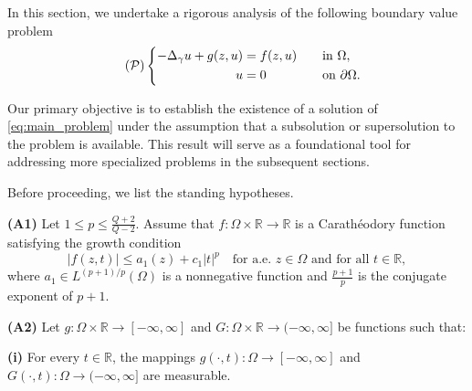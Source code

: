 \documentclass[11pt]{article}
\newcommand{\Gr}{\Delta_{\gamma}}
\begin{document}
In this section, we undertake a rigorous analysis of the following boundary value problem
\begin{equation}
\label{eq:main_problem}\tag{$\mathcal{P}$}
\begin{cases}
\begin{aligned}
- \Gr u + g(z,u) &= f(z,u) \quad &&\text{in } \Omega, \\
u &= 0 \quad &&\text{on } \partial\Omega. 
\end{aligned}
\end{cases}
\end{equation}

Our primary objective is to establish the existence of a solution of \eqref{eq:main_problem} under the assumption that a subsolution or supersolution to the problem is available. This result will serve as a foundational tool for addressing more specialized problems in the subsequent sections.

Before proceeding, we list the standing hypotheses. 

\medskip


\medskip

 \textbf{(A1)} Let $1 \le p \le \frac{Q+2}{Q-2}$. 
Assume that $f : \Omega \times \mathbb{R} \to \mathbb{R}$ is a Carath\'eodory function satisfying the growth condition
\begin{equation*}
|f(z,t)| \le a_1(z) + c_1 |t|^p
\quad \text{for a.e. } z \in \Omega \text{ and for all } t \in \mathbb{R},
\end{equation*}
where $a_1 \in L^{(p+1)/p}(\Omega)$ is a nonnegative function and $\frac{p+1}{p}$ is the conjugate exponent of $p+1$.

\medskip

 \textbf{(A2)} Let $g : \Omega \times \mathbb{R} \to [-\infty,\infty]$ and $G : \Omega \times \mathbb{R} \to (-\infty,\infty]$ be functions such that:

\medskip

 \textbf{(i)} For every $t \in \mathbb{R}$, the mappings $g(\cdot,t) : \Omega \to [-\infty,\infty]$ and $G(\cdot,t) : \Omega \to (-\infty,\infty]$ are measurable.  
\end{document}
